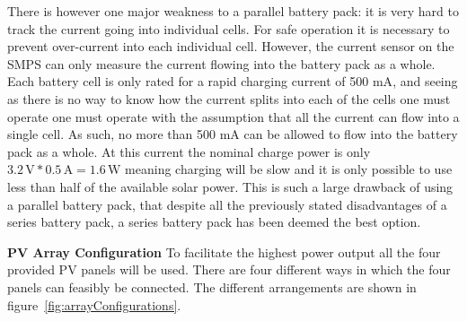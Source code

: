 \documentclass[a4paper]{article}
\newcommand{\unit}[1]{\ensuremath{\, \mathrm{#1}}}
\begin{document}
There is however one major weakness to a parallel battery pack: 
it is very hard to track the current going into individual cells. For 
safe operation it is necessary to prevent over-current into each individual 
cell. However, the current sensor on the SMPS can only measure the current 
flowing into the battery pack as a whole. Each battery cell is only rated 
for a rapid charging current of 500 mA\cite{batteryDatasheet},  and seeing 
as there is no way to know how the current splits into each of the cells 
one must operate one must operate with the assumption that all the current 
can flow into a single cell. As such, no more than 500 mA can be allowed 
to flow into the battery pack as a whole. At this current the nominal 
charge power is only \(3.2 \unit{V} * 0.5 \unit{A} = 1.6 \unit{W} \)
    meaning charging will be slow and it is only possible to use less than half of the available solar power. 
This is such a large drawback of using a parallel battery pack, that 
despite all the previously stated disadvantages of a series battery pack, 
a series battery pack has been deemed the best option.


\textbf{PV Array Configuration}
\vspace{10pt} 
\newline
To facilitate the highest power output all the four provided PV panels will be used.
There are four different ways in which the four panels can feasibly be connected. 
The different arrangements are shown in figure~\ref{fig:arrayConfigurations}.
\end{document}
